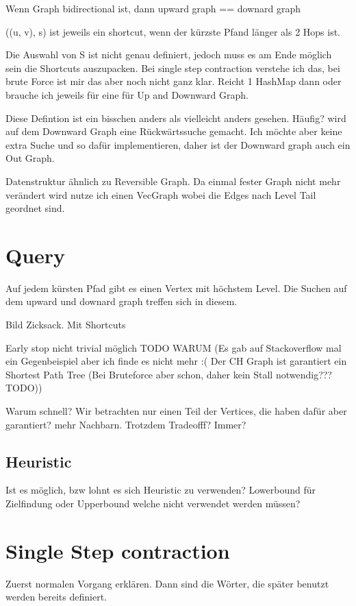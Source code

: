 Wenn Graph bidirectional ist, dann upward graph == downard graph

((u, v), s) ist jeweils ein shortcut, wenn der kürzste Pfand länger als 2 Hops ist.

Die Auswahl von S ist nicht genau definiert, jedoch muss es am Ende möglich sein die Shortcuts auszupacken.
Bei single step contraction verstehe ich das, bei brute Force ist mir das aber noch nicht ganz klar. Reicht 1 HashMap dann oder brauche ich jeweils für eine für Up and Downward Graph.


Diese Defintion ist ein bisschen anders als vielleicht anders gesehen. Häufig? wird auf dem Downward Graph eine Rückwärtssuche gemacht. Ich möchte aber keine extra Suche und so dafür implementieren, daher ist der Downward graph auch ein Out Graph.

Datenstruktur ähnlich zu Reversible Graph. Da einmal fester Graph nicht mehr verändert wird nutze ich einen VecGraph wobei die Edges nach Level Tail geordnet sind.

\section{Query}
Auf jedem kürsten Pfad gibt es einen Vertex mit höchstem Level. Die Suchen auf dem upward und downard graph treffen sich in diesem.

Bild Zicksack. Mit Shortcuts

Early stop nicht trivial möglich TODO WARUM (Es gab auf Stackoverflow mal ein Gegenbeispiel aber ich finde es nicht mehr :( Der CH Graph ist garantiert ein Shortest Path Tree (Bei Bruteforce aber schon, daher kein Stall notwendig??? TODO))

Warum schnell? Wir betrachten nur einen Teil der Vertices, die haben dafür aber garantiert? mehr Nachbarn. Trotzdem Tradeofff? Immer?

\subsection{Heuristic}

Ist es möglich, bzw lohnt es sich Heuristic zu verwenden? Lowerbound für Zielfindung oder Upperbound welche nicht verwendet werden müssen?


\section{Single Step contraction}
Zuerst normalen Vorgang erklären. Dann sind die Wörter, die später benutzt werden bereits definiert.

